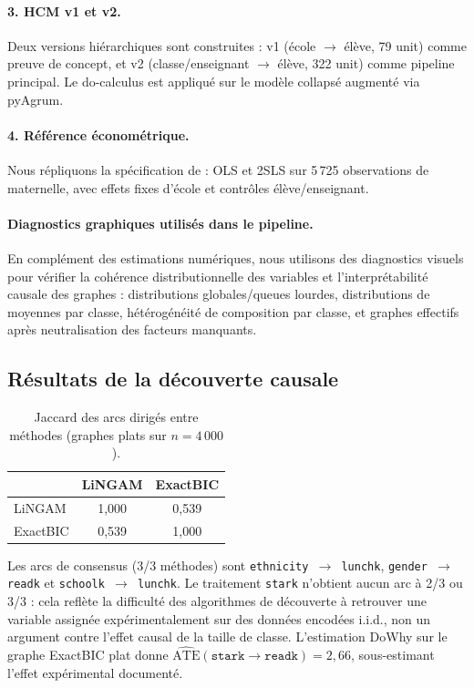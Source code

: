 \documentclass[11pt,a4paper]{article}
\begin{document}
\paragraph{3. HCM v1 et v2.}
Deux versions hiérarchiques sont construites : v1 (école $\to$ élève, 79 unit) comme preuve de concept, et v2 (classe/enseignant $\to$ élève, 322 unit) comme pipeline principal. Le do-calculus est appliqué sur le modèle collapsé augmenté via pyAgrum.

\paragraph{4. Référence économétrique.}
Nous répliquons la spécification de \citet{Krueger1999} : OLS et 2SLS sur 5\,725 observations de maternelle, avec effets fixes d'école et contrôles élève/enseignant.

\paragraph{Diagnostics graphiques utilisés dans le pipeline.}
En complément des estimations numériques, nous utilisons des diagnostics visuels pour vérifier la cohérence distributionnelle des variables et l'interprétabilité causale des graphes : distributions globales/queues lourdes, distributions de moyennes par classe, hétérogénéité de composition par classe, et graphes effectifs après neutralisation des facteurs manquants.

\subsection{Résultats de la découverte causale}

\begin{table}[!htbp]
\centering
\caption{Jaccard des arcs dirigés entre méthodes (graphes plats sur $n=4\,000$).}
\label{tab:jaccard}
\begin{tabular}{lcc}
\toprule
 & LiNGAM & ExactBIC \\
\midrule
LiNGAM   & 1{,}000 & 0{,}539 \\
ExactBIC & 0{,}539 & 1{,}000 \\
\bottomrule
\end{tabular}
\end{table}

Les arcs de consensus (3/3 méthodes) sont \texttt{ethnicity $\to$ lunchk}, \texttt{gender $\to$ readk} et \texttt{schoolk $\to$ lunchk}. Le traitement \texttt{stark} n'obtient aucun arc à 2/3 ou 3/3 : cela reflète la difficulté des algorithmes de découverte à retrouver une variable assignée expérimentalement sur des données encodées i.i.d., non un argument contre l'effet causal de la taille de classe. L'estimation DoWhy sur le graphe ExactBIC plat donne $\widehat{\mathrm{ATE}}(\texttt{stark} \to \texttt{readk}) = 2{,}66$, sous-estimant l'effet expérimental documenté.
\end{document}
